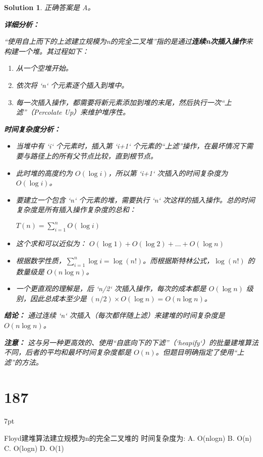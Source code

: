 \documentclass[UTF8]{report}
\newtheorem{solution}{Solution}
\theoremstyle{MyLineTheoremStyle} %
\theoremstyle{MyBlockTheoremStyle} %
\theoremstyle{MySubsubsectionStyle} %
\newenvironment{graybox}{%
        \def\FrameCommand{%
        \hspace{1pt}%
        {\color{gray}\small \vrule width 2pt}%
        {\color{graybox_color}\vrule width 4pt}%
        \colorbox{graybox_color}%
        }%
        \MakeFramed{\advance\hsize-\width\FrameRestore}%
        \noindent\hspace{-4.55pt}%
        \begin{adjustwidth}{}{7pt}%
        \vspace{2pt}\vspace{2pt}%
        }
        {%
        \vspace{2pt}\end{adjustwidth}\endMakeFramed%
        }
\begin{document}
\begin{solution}
正确答案是 A。

\textbf{详细分析：}

“使用自上而下的上滤建立规模为n的完全二叉堆”指的是通过\textbf{连续n次插入操作}来构建一个堆。其过程如下：
\begin{enumerate}
    \item 从一个空堆开始。
    \item 依次将 `n` 个元素逐个插入到堆中。
    \item 每一次插入操作，都需要将新元素添加到堆的末尾，然后执行一次“上滤”（Percolate Up）来维护堆序性。
\end{enumerate}

\textbf{时间复杂度分析：}
\begin{itemize}
    \item 当堆中有 `i` 个元素时，插入第 `i+1` 个元素的“上滤”操作，在最坏情况下需要与路径上的所有父节点比较，直到根节点。
    \item 此时堆的高度约为 $O(\log i)$，所以第 `i+1` 次插入的时间复杂度为 $O(\log i)$。
    \item 要建立一个包含 `n` 个元素的堆，需要执行 `n` 次这样的插入操作。总的时间复杂度是所有插入操作复杂度的总和：
    \begin{center}
    $T(n) = \sum_{i=1}^{n} O(\log i)$
    \end{center}
    \item 这个求和可以近似为：
    $O(\log 1) + O(\log 2) + \dots + O(\log n)$
    \item 根据数学性质，$\sum_{i=1}^{n} \log i = \log(n!)$。而根据斯特林公式，$\log(n!)$ 的数量级是 $O(n \log n)$。
    \item 一个更直观的理解是，后 `n/2` 次插入操作，每次的成本都是 $O(\log n)$ 级别，因此总成本至少是 $(n/2) \times O(\log n) = O(n \log n)$。
\end{itemize}

\textbf{结论：}
通过连续 `n` 次插入（每次都伴随上滤）来建堆的时间复杂度是 $O(n \log n)$。

\textbf{注意：}
这与另一种更高效的、使用“自底向下的下滤”（`heapify`）的批量建堆算法不同，后者的平均和最坏时间复杂度都是 $O(n)$。但题目明确指定了使用“上滤”的方法。
\end{solution}

\section*{187}
\begin{graybox}
Floyd建堆算法建立规模为n的完全二叉堆的
时间复杂度为:
A. O(nlogn)
B. O(n)
C. O(logn)
D. O(1)
\end{graybox}
\end{document}
